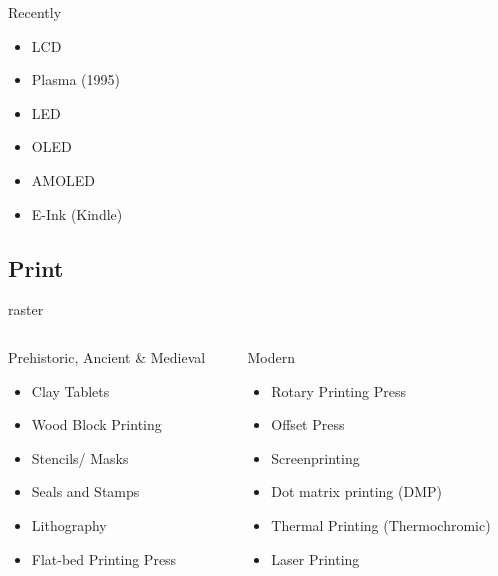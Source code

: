 \documentclass[aspectratio=169,xcolor={dvipsnames,svgnames}]{beamer}
\begin{document}
\begin{frame}[label={sec:orgaed02f7}]{Recently}
\begin{itemize}
\item LCD
\item Plasma (1995)
\item LED
\item OLED
\item AMOLED
\item E-Ink (Kindle)
\end{itemize}
\end{frame}

\subsection{Print}
\label{sec:orgc4365fb}

\begin{frame}[label={sec:orge310367}]{raster}
\begin{columns}
\begin{column}{0.5\columnwidth}
Prehistoric, Ancient \& Medieval
\begin{itemize}
\item Clay Tablets
\item Wood Block Printing
\item Stencils/ Masks
\item Seals and Stamps
\item Lithography
\item Flat-bed Printing Press
\end{itemize}
\end{column}
\begin{column}{.5\columnwidth}
Modern
\begin{itemize}
\item Rotary Printing Press
\item Offset Press
\item Screenprinting
\item Dot matrix printing (DMP)
\item Thermal Printing (Thermochromic)
\item Laser Printing
\end{itemize}
\end{column}
\end{columns}
\end{frame}
\end{document}

